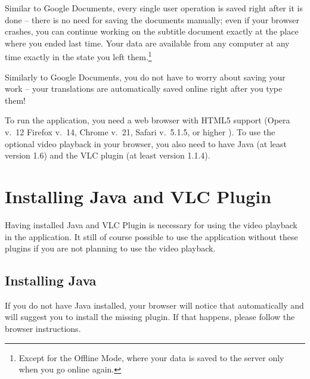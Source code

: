 Similar to Google Documents, every single user operation is saved right after it is done -- there is no need for saving the documents manually; even if your browser crashes, you can continue working on the subtitle document exactly at the place where you ended last time.
Your data are available from any computer at any time exactly in the state you left them.\footnote{Except for the Offline Mode, where your data is saved to the server only when you go online again.}

Similarly to Google Documents, you do not have to worry about saving your work -- your translations are automatically saved online right after you type them!

To run the application, you need a web browser with HTML5 support (Opera v.~12
Firefox v.~14, Chrome v.~21, Safari v.~5.1.5, or higher ). To use the optional video playback in your browser, you also need to have Java (at least version 1.6) and the VLC plugin (at least version 1.1.4).

\section{Installing Java and VLC Plugin}
\label{um:sec:installations}

Having installed Java and VLC Plugin is necessary for using the video playback in the application. It still of course possible to use the application without these plugins if you are not planning to use the video playback.

\subsection{Installing Java}

If you do not have Java installed, your browser will notice that automatically and will suggest you to install the missing plugin. If that happens, please follow the browser instructions.

